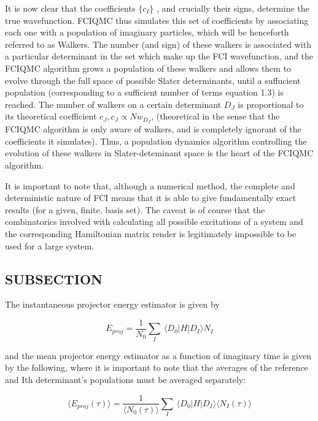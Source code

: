 \documentclass[final,3p,times,twocolumn]{elsarticle}
\numberwithin{equation}{section}
\begin{document}
It is now clear that the coefficients $\{c_I\}$ , and crucially their signs, determine the true wavefunction. FCIQMC thus simulates this set of coefficients by associating each one with a population of imaginary particles, which will be henceforth referred to as Walkers. The number (and sign) of these walkers is associated with a particular determinant in the set which make up the FCI wavefunction, and the FCIQMC algorithm grows a population of these walkers and allows them to evolve through the full space of possible Slater determinants, until a suffucient population (corresponding to a sufficient number of terms equation 1.3) is reached. The number of walkers on a certain determinant $D_J$ is proportional to its theoretical coefficient $c_J, c_J \propto Nw_{D_J} $,  (theoretical in the sense that the FCIQMC algorithm is only aware of walkers, and is completely ignorant of the coefficients it simulates). Thus, a population dynamics algorithm controlling the evolution of these walkers in Slater-deteminant space is the heart of the FCIQMC algorithm.


It is important to note that, although a numerical method, the complete and deterministic nature of FCI means that it is able to give fundamentally exact results (for a given, finite, basis set). The caveat is of course that the combinatorics involved with calculating all possible excitations of a system and the corresponding Hamiltonian matrix render is legitimately impossible to be used for a large system.



\subsection{SUBSECTION}
The instantaneous projector energy estimator is given by

\begin{equation}
E_{proj} = \frac{1}{N_0} \sum_I \  \langle D_0 | H | D_I \rangle N_I
\end{equation}

and the mean projector energy estimator as a function of imaginary time is given by the following, where it is important to note that the averages of the reference and Ith determinant's populations must be averaged separately:


\begin{equation}
\langle E_{proj}(\tau) \rangle = \frac{1}{\langle N_0(\tau) \rangle}  \sum_I \  \langle D_0 | H | D_I \rangle \langle N_I(\tau) \rangle
\end{equation}
\end{document}
